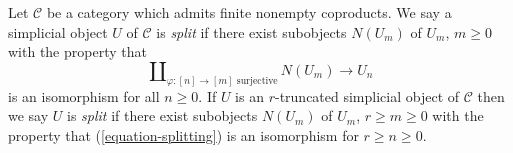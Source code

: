 \begin{definition}
\label{definition-split}
Let $\mathcal{C}$ be a category which admits finite nonempty coproducts.
We say a simplicial object $U$ of $\mathcal{C}$ is {\it split}
if there exist subobjects $N(U_m)$ of $U_m$, $m \geq 0$
with the property that
\begin{equation}
\label{equation-splitting}
\coprod\nolimits_{\varphi : [n] \to [m]\text{ surjective}}
N(U_m)
\longrightarrow
U_n
\end{equation}
is an isomorphism for all $n \geq 0$. If $U$ is an $r$-truncated
simplicial object of $\mathcal{C}$ then we say $U$ is {\it split}
if there exist subobjects $N(U_m)$ of $U_m$, $r \geq m \geq 0$
with the property that (\ref{equation-splitting})
is an isomorphism for $r \geq n \geq 0$.
\end{definition}